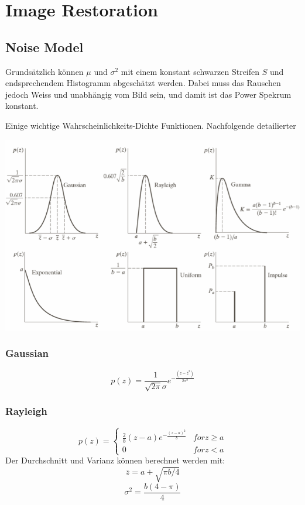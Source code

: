 \section{Image Restoration}
\subsection{Noise Model}
Grundsätzlich können $\mu$ und $\sigma^2$ mit einem konstant schwarzen Streifen $S$ und endsprechendem Histogramm abgeschätzt werden. Dabei muss das Rauschen jedoch Weiss und unabhängig vom Bild sein, und damit ist das Power Spekrum konstant.

Einige wichtige Wahrscheinlichkeits-Dichte Funktionen. Nachfolgende detailierter
\begin{center}
	\includegraphics[width=\columnwidth]{Images/pdf_nois}
\end{center}

\subsubsection{Gaussian}
\[
p(z) = \frac{1}{\sqrt{2\pi}\sigma}e^{-\frac{(z-\overline{z}^2)}{2\sigma^2}}
\]

\subsubsection{Rayleigh}
\[
p(z) = \begin{cases}
	\frac{2}{b}(z-a)e^{-\frac{(z-a)^2}{b}} & for z \ge a \\
	0 & for z \lt a
\end{cases}
\]
Der Durchschnitt und Varianz können berechnet werden mit: 
\[
\overline{z} = a + \sqrt{\pi b / 4}
\]
\[
\sigma^2 = \frac{b(4-\pi)}{4}
\]

